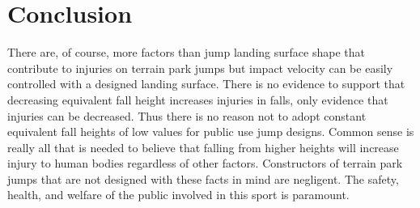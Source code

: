 \documentclass{article}
\begin{document}
\section{Conclusion}
%
There are, of course, more factors than jump landing surface shape that
contribute to injuries on terrain park jumps but impact velocity can be easily
controlled with a designed landing surface. There is no evidence to support
that decreasing equivalent fall height increases injuries in falls, only
evidence that injuries can be decreased. Thus there is no reason not to adopt
constant equivalent fall heights of low values for public use jump designs.
Common sense is really all that is needed to believe that falling from higher
heights will increase injury to human bodies regardless of other factors.
Constructors of terrain park jumps that are not designed with these facts in
mind are negligent. The safety, health, and welfare of the public involved in
this sport is paramount.



\end{document}

